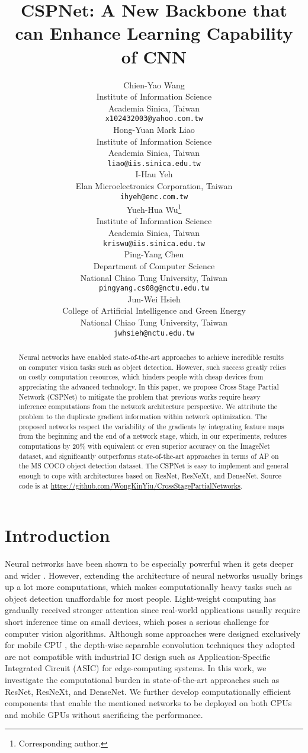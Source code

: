 \documentclass{article}
\title{CSPNet: A New Backbone that can Enhance Learning Capability of CNN}
\author{
  Chien-Yao Wang \\
  Institute of Information Science\\
  Academia Sinica, Taiwan\\
  \texttt{x102432003@yahoo.com.tw} \\
  \And
  Hong-Yuan Mark Liao \\
  Institute of Information Science\\
  Academia Sinica, Taiwan\\
  \texttt{liao@iis.sinica.edu.tw} \\
  \And
  I-Hau Yeh \\
  Elan Microelectronics Corporation, Taiwan\\
  \texttt{ihyeh@emc.com.tw} \\
  \And
  Yueh-Hua Wu\thanks{Corresponding author.} \\
  Institute of Information Science\\
  Academia Sinica, Taiwan\\
  \texttt{kriswu@iis.sinica.edu.tw} \\
  \And
  Ping-Yang Chen \\
  Department of Computer Science\\
  National Chiao Tung University, Taiwan\\
  \texttt{pingyang.cs08g@nctu.edu.tw} \\
  \And
  Jun-Wei Hsieh \\
  College of Artificial Intelligence and Green Energy\\
  National Chiao Tung University, Taiwan\\
  \texttt{jwhsieh@nctu.edu.tw} \\
}
\begin{document}
\maketitle

\begin{abstract}
   Neural networks have enabled state-of-the-art approaches to achieve incredible results on computer vision tasks such as object detection.  However, such success greatly relies on costly computation resources, which hinders people with cheap devices from appreciating the advanced technology.  In this paper, we propose Cross Stage Partial Network (CSPNet) to mitigate the problem that previous works require heavy inference computations from the network architecture perspective.  We attribute the problem to the duplicate gradient information within network optimization.  The proposed networks respect the variability of the gradients by integrating feature maps from the beginning and the end of a network stage, which, in our experiments, reduces computations by 20\% with equivalent or even superior accuracy on the ImageNet dataset, and significantly outperforms state-of-the-art approaches in terms of AP on the MS COCO object detection dataset.  The CSPNet is easy to implement and general enough to cope with architectures based on ResNet, ResNeXt, and DenseNet. Source code is at \url{https://github.com/WongKinYiu/CrossStagePartialNetworks}.
\end{abstract}





\section{Introduction}

Neural networks have been shown to be especially powerful when it gets deeper \cite{he2016deep, xie2017aggregated, huang2017densely} and wider \cite{Zagoruyko2016WRN}. However, extending the architecture of neural networks usually brings up a lot more computations, which makes computationally heavy tasks such as object detection unaffordable for most people. Light-weight computing has gradually received stronger attention since real-world applications usually require short inference time on small devices, which poses a serious challenge for computer vision algorithms. Although some approaches were designed exclusively for mobile CPU \cite{howard2017mobilenets, sandler2018mobilenetv2, howard2019searching, tan2019mnasnet, zhang2018shufflenet, ma2018shufflenetv2}, the depth-wise separable convolution techniques they adopted are not compatible with industrial IC design such as Application-Specific Integrated Circuit (ASIC) for edge-computing systems.
In this work, we investigate the computational burden in state-of-the-art approaches such as ResNet, ResNeXt, and DenseNet. We further develop computationally efficient components that enable the mentioned networks to be deployed on both CPUs and mobile GPUs without sacrificing the performance.
\end{document}
